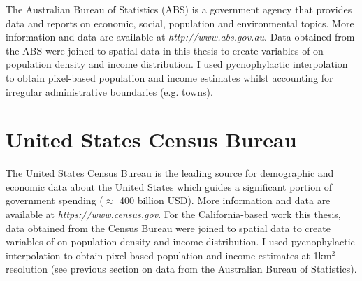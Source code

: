 The Australian Bureau of Statistics (ABS) is a government agency that provides data and reports on economic, social, population and environmental topics. More information and data are available at \textit{http://www.abs.gov.au}. Data obtained from the ABS were joined to spatial data in this thesis to create variables of on population density and income distribution. I used pycnophylactic interpolation \citep{tobl79} to obtain pixel-based population and income estimates whilst accounting for irregular administrative boundaries (e.g. towns).

\section{United States Census Bureau}

The United States Census Bureau is the leading source for demographic and economic data about the United States which guides a significant portion of government spending ($\approx$ 400 billion USD). More information and data are available at \textit{https://www.census.gov}. For the California-based work this thesis, data obtained from the Census Bureau were joined to spatial data to create variables of on population density and income distribution. I used pycnophylactic interpolation to obtain pixel-based population and income estimates at 1km$^2$ resolution (see previous section on data from the Australian Bureau of Statistics).

